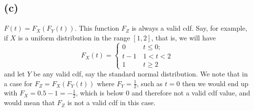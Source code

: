\documentclass{article}
\begin{document}
{\subsection*{(c)}
$F\left(t\right)=F_{X}\left(F_{Y}\left(t\right)\right)$.
This function $F_Z$ is  always a valid cdf. Say, for example, if $X$ is a uniform distribution in the range $[1,2]$, that is, we will have \\ 
\[
F_{X}\left(t\right)=\begin{cases}
0 & \, t \leq 0;\\
t - 1 & \,1 < t < 2\\
1 & \, t \geq 2
\end{cases}
\]
and let $Y$ be any valid cdf, say the standard normal distribution. We note that in a case for $F_Z = F_X(F_Y(t))$ where $F_Y = \frac{1}{2}$, such as $t = 0$ then we would end up with $F_X = 0.5 - 1 = -\frac{1}{2}$, which is below 0 and therefore not a valid cdf value, and would mean that $F_Z$ is not a valid cdf in this case.

}
\end{document}
